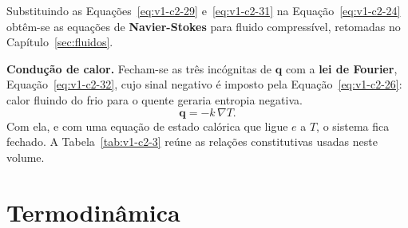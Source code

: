 \documentclass[12pt,a4paper]{article}
\numberwithin{equation}{section}
\numberwithin{table}{section}
\numberwithin{figure}{section}
\begin{document}
Substituindo as Equações~\eqref{eq:v1-c2-29} e~\eqref{eq:v1-c2-31} na
Equação~\eqref{eq:v1-c2-24} obtêm-se as equações de \textbf{Navier-Stokes} para
fluido compressível, retomadas no Capítulo~\ref{sec:fluidos}.

\textbf{Condução de calor.} Fecham-se as três incógnitas de $\mathbf{q}$ com a
\textbf{lei de Fourier}, Equação~\eqref{eq:v1-c2-32}, cujo sinal negativo é
imposto pela Equação~\eqref{eq:v1-c2-26}: calor fluindo do frio para o quente
geraria entropia negativa.
\begin{equation}\label{eq:v1-c2-32}
\mathbf{q} = -k\,\nabla T .
\end{equation}
Com ela, e com uma equação de estado calórica que ligue $e$ a $T$, o sistema
fica fechado. A Tabela~\ref{tab:v1-c2-3} reúne as relações constitutivas usadas
neste volume.

\begin{table}[H]
\centering
\caption[Relações constitutivas usadas no volume]{Relações constitutivas para
sólidos elásticos, fluidos newtonianos e condução de calor.}
\label{tab:v1-c2-3}
\small
{}
\end{table}


\section{Termodinâmica}\label{sec:termodinamica}
\end{document}
